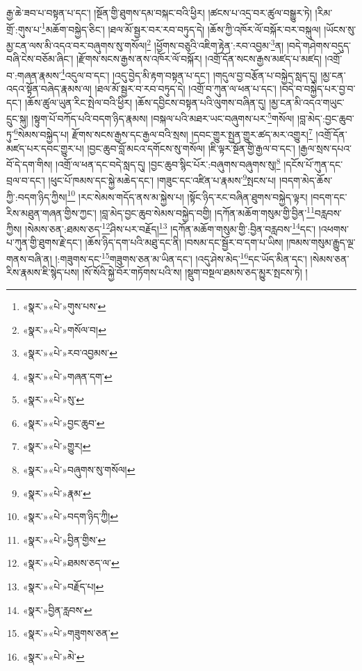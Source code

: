 རྒྱ་ཆེ་ཟབ་པ་བསྟན་པ་དང་། །སྔོན་གྱི་ཐུགས་དམ་བསྐང་བའི་ཕྱིར། །ཚངས་པ་འདྲ་བར་ཚུལ་བསྒྱུར་ཏེ། །རིམ་གྲོ་:གུས་པ་\footnote{«སྣར་»«པེ་»གུས་པས་}མཆོག་བསྐྱེད་ཅིང་། །ཐལ་མོ་སྦྱར་བར་རབ་བཏུད་དེ། །ཆོས་ཀྱི་འཁོར་ལོ་བསྐོར་བར་བསྐུལ། །ཡོངས་སུ་མྱ་ངན་ལས་མི་འདའ་བར་བཞུགས་སུ་གསོལ།\footnote{«སྣར་»«པེ་»གསོལ་བ།} །ཕྱོགས་བཅུའི་འཇིག་རྟེན་:རབ་འབྱམ་\footnote{«སྣར་»«པེ་»རབ་འབྱམས་}ན། །བདེ་གཤེགས་བདུད་བཞི་ངེས་བཅོམ་ཞིང་། །རྫོགས་སངས་རྒྱས་ནས་འཁོར་ལོ་བསྐོར། །འགྲོ་དོན་སངས་རྒྱས་མཛད་པ་མཛད། །འགྲོ་བ་:གཞན་རྣམས་\footnote{«སྣར་»«པེ་»གཞན་དག་}འདུལ་བ་དང་། །འདུ་བྱེད་མི་རྟག་བསྟན་པ་དང་། །གདུལ་བྱ་བརྩོན་པ་བསྐྱེད་སླད་དུ། །མྱ་ངན་འདའ་སྟོན་བཞེད་རྣམས་ལ། །ཐལ་མོ་སྦྱར་བ་རབ་བཏུད་དེ། །འགྲོ་བ་ཀུན་ལ་ཕན་པ་དང་། །བདེ་བ་བསྐྱེད་པར་བྱ་བ་དང་། །ཆོས་ཚུལ་ཡུན་རིང་སྤེལ་བའི་ཕྱིར། །ཆོས་དབྱིངས་བསྟན་པའི་ལུགས་བཞིན་དུ། །མྱ་ངན་མི་འདའ་གཡུང་དྲུང་སྐུ། །སྟུག་པོ་བཀོད་པའི་བདག་ཉིད་རྣམས། །བསྐལ་པའི་མཐར་ཡང་བཞུགས་པར་\footnote{«སྣར་»«པེ་»སུ་}གསོལ། །བླ་མེད་:བྱང་ཆུབ་ཏུ་\footnote{«སྣར་»«པེ་»བྱང་ཆུབ་}སེམས་བསྐྱེད་པ། རྫོགས་སངས་རྒྱས་དང་རྒྱལ་བའི་སྲས། །དབང་གྱུར་སྤྱན་གྱུར་ཚད་མར་འགྱུར།\footnote{«སྣར་»«པེ་»གྱུར།} །འགྲོ་དོན་མཛད་པར་དབང་གྱུར་པ། །བྱང་ཆུབ་བློ་མངའ་དགོངས་སུ་གསོལ། །ཇི་ལྟར་སྔོན་གྱི་རྒྱལ་བ་དང་། །རྒྱལ་སྲས་དཔའ་བོ་དེ་དག་གིས། །འགྲོ་ལ་ཕན་དང་བདེ་སླད་དུ། །བྱང་ཆུབ་སྙིང་པོར་:བཞུགས་བཞུགས་སུ།\footnote{«སྣར་»«པེ་»བཞུགས་སུ་གསོལ།} །དངོས་པོ་ཀུན་དང་བྲལ་བ་དང་། །ཕུང་པོ་ཁམས་དང་སྐྱེ་མཆེད་དང་། །གཟུང་དང་འཛིན་པ་རྣམས་\footnote{«སྣར་»«པེ་»རྣམ་}སྤངས་པ། །བདག་མེད་ཆོས་ཀྱི་:བདག་ཉིད་ཀྱིས།\footnote{«སྣར་»«པེ་»བདག་ཉིད་ཀྱི།} །རང་སེམས་གདོད་ནས་མ་སྐྱེས་པ། །སྟོང་ཉིད་རང་བཞིན་ཐུགས་བསྐྱེད་ལྟར། །བདག་དང་རིས་མཐུན་གཞན་གྱིས་ཀྱང་། །བླ་མེད་བྱང་ཆུབ་སེམས་བསྐྱེད་བགྱི། །དཀོན་མཆོག་གསུམ་གྱི་བྱིན་\footnote{«སྣར་»«པེ་»བྱིན་གྱིས་}བརླབས་ཀྱིས། །སེམས་ཅན་:ཐམས་ཅད་\footnote{«སྣར་»«པེ་»ཐམས་ཅད་ལ་}ཤིས་པར་བརྗོད།\footnote{«སྣར་»«པེ་»བརྗོད་པ།} །དཀོན་མཆོག་གསུམ་གྱི་:བྱིན་བརླབས་\footnote{«སྣར་»བྱིན་རླབས་}དང་། །འཕགས་པ་ཀུན་གྱི་ཐུགས་རྗེ་དང་། །ཆོས་ཉིད་དག་པའི་མཐུ་དང་ནི། །བསམ་དང་སྦྱོར་བ་དག་པ་ཡིས། །ཁམས་གསུམ་རྒྱུད་ལྔ་གནས་བཞི་ན། །:གཟུགས་དང་\footnote{«སྣར་»«པེ་»གཟུགས་ཅན་}གཟུགས་ཅན་མ་ཡིན་དང་། །འདུ་ཤེས་མེད་\footnote{«སྣར་»«པེ་»མེ་}དང་ཡོད་མིན་དང་། །སེམས་ཅན་རིས་རྣམས་ཇི་སྙེད་པས། །སོ་སོའི་སྐྱེ་བོར་གཏོགས་པའི་ས། །སྡུག་བསྔལ་ཐམས་ཅད་མྱུར་སྤངས་ཏེ། །
